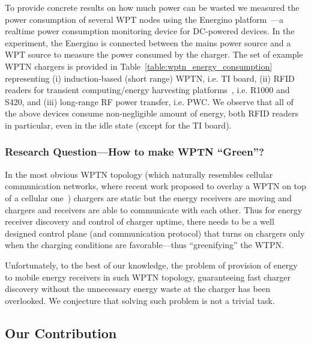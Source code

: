 \documentclass[11pt,draftclsnofoot,journal,onecolumn]{IEEEtran}
\begin{document}
To provide concrete results on how much power can be wasted we measured the power consumption of several WPT nodes using the Energino platform~\cite{gomez_wiopt_2012}---a realtime power consumption monitoring device for DC-powered devices. In the experiment, the Energino is connected between the mains power source and a WPT source to measure the power consumed by the charger. The set of example WPTN chargers is provided in Table~\ref{table:wptn_energy_consumption} representing (i) induction-based (short range) WPTN, i.e. TI board, (ii) RFID readers for transient computing/energy harvesting platforms~\cite{gollakota_computer_2014}, i.e. R1000 and S420, and (iii) long-range RF power transfer, i.e. PWC. We observe that all of the above devices consume non-negligible amount of energy, both RFID readers in particular, even in the idle state (except for the TI board).

\subsubsection{Research Question---How to make WPTN ``Green''?}
\label{sec:research_question}

In the most obvious WPTN topology (which naturally resembles cellular communication networks, where recent work proposed to overlay a WPTN on top of a cellular one~\cite{huang_arxiv_2012}) chargers are static but the energy receivers are moving and chargers and receivers are able to communicate with each other. Thus for energy receiver discovery and control of charger uptime, there needs to be a well designed control plane (and communication protocol) that turns on chargers only when the charging conditions are favorable---thus ``greenifying'' the WTPN.

Unfortunately, to the best of our knowledge, the problem of provision of energy to mobile energy receivers in such WPTN topology, guaranteeing fast charger discovery without the unnecessary energy waste at the charger has been overlooked. We conjecture that solving such problem is not a trivial task.

\subsection{Our Contribution}
\label{sec:contribution}
\end{document}
